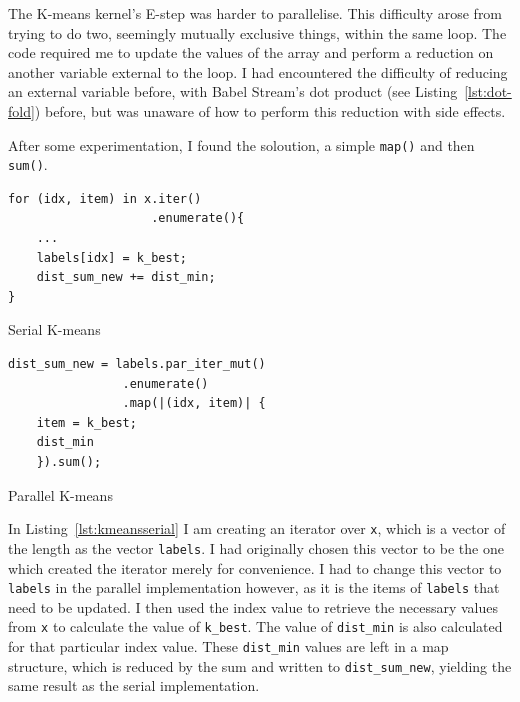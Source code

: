 The K-means kernel's E-step was harder to parallelise. This difficulty arose from trying to do two, seemingly mutually exclusive things, within the same loop. The code required me to update the values of the array and perform a reduction on another variable external to the loop. I had encountered the difficulty of reducing an external variable before, with Babel Stream's dot product (see Listing~\ref{lst:dot-fold}) before, but was unaware of how to perform this reduction with side effects.

After some experimentation, I found the soloution, a simple \texttt{map()} and then \texttt{sum()}. 
\begin{minipage}{.48\textwidth}
\begin{listing}[H]
\begin{verbatim}
for (idx, item) in x.iter()
                    .enumerate(){
    ...
    labels[idx] = k_best;
    dist_sum_new += dist_min;
}
\end{verbatim}
\label{lst:kmeansserial}
\caption{Serial K-means}
\end{listing}
\end{minipage}\hfill
\begin{minipage}{.48\textwidth}
\begin{listing}[H]
\begin{verbatim}
dist_sum_new = labels.par_iter_mut()
                .enumerate()
                .map(|(idx, item)| {
    item = k_best;
    dist_min
    }).sum();
\end{verbatim}
\label{lst:kmeanspar}
\caption{Parallel K-means}
\end{listing}
\end{minipage}

In Listing~\ref{lst:kmeansserial} I am creating an iterator over \texttt{x}, which is a vector of the length as the vector \texttt{labels}. I had originally chosen this vector to be the one which created the iterator merely for convenience. I had to change this vector to \texttt{labels} in the parallel implementation however, as it is the items of \texttt{labels} that need to be updated. I then used the index value to retrieve the necessary values from \texttt{x} to calculate the value of \texttt{k\_best}. The value of \texttt{dist\_min} is also calculated for that particular index value. These \texttt{dist\_min} values are left in a map structure, which is reduced by the sum and written to \texttt{dist\_sum\_new}, yielding the same result as the serial implementation. 


